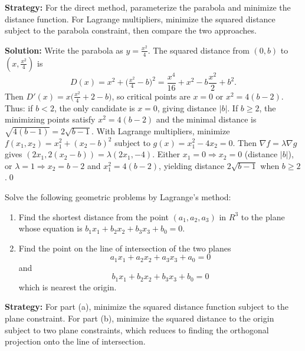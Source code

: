 \noindent\textbf{Strategy:} For the direct method, parameterize the parabola and minimize the distance function. For Lagrange multipliers, minimize the squared distance subject to the parabola constraint, then compare the two approaches.

\bigskip\noindent\textbf{Solution:}
Write the parabola as $y=\tfrac{x^2}{4}$. The squared distance from $(0,b)$ to $(x,\tfrac{x^2}{4})$ is
\[D(x)=x^2+\Big(\tfrac{x^2}{4}-b\Big)^2=\frac{x^4}{16}+x^2-b\frac{x^2}{2}+b^2.
\]
Then $D'(x)=x\Big(\tfrac{x^2}{4}+2-b\Big)$, so critical points are $x=0$ or $x^2=4(b-2)$. Thus: if $b<2$, the only candidate is $x=0$, giving distance $|b|$. If $b\ge 2$, the minimizing points satisfy $x^2=4(b-2)$ and the minimal distance is $\sqrt{4(b-1)}=2\sqrt{b-1}$.
With Lagrange multipliers, minimize $f(x_1,x_2)=x_1^2+(x_2-b)^2$ subject to $g(x)=x_1^2-4x_2=0$. Then $\nabla f=\lambda\nabla g$ gives $(2x_1,2(x_2-b))=\lambda(2x_1,-4)$. Either $x_1=0\Rightarrow x_2=0$ (distance $|b|$), or $\lambda=1\Rightarrow x_2=b-2$ and $x_1^2=4(b-2)$, yielding distance $2\sqrt{b-1}$ when $b\ge2$.\qed


\begin{problembox}
\begin{problemstatement}
Solve the following geometric problems by Lagrange's method:
\begin{enumerate}[label=(\alph*)]
    \item Find the shortest distance from the point \((a_1, a_2, a_3)\) in \( R^3 \) to the plane whose equation is \( b_1x_1 + b_2x_2 + b_3x_3 + b_0 = 0 \).
    \item Find the point on the line of intersection of the two planes
    \[a_1x_1 + a_2x_2 + a_3x_3 + a_0 = 0\]
    and
    \[b_1x_1 + b_2x_2 + b_3x_3 + b_0 = 0\]
    which is nearest the origin.
\end{enumerate}
\end{problemstatement}
\end{problembox}

\noindent\textbf{Strategy:} For part (a), minimize the squared distance function subject to the plane constraint. For part (b), minimize the squared distance to the origin subject to two plane constraints, which reduces to finding the orthogonal projection onto the line of intersection.

